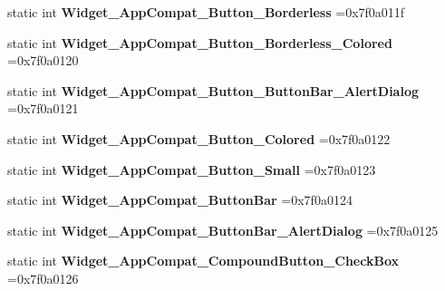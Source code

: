 \begin{DoxyCompactItemize}
static int {\bfseries Widget\+\_\+\+App\+Compat\+\_\+\+Button\+\_\+\+Borderless} =0x7f0a011f
\item 
\mbox{\label{classandroid_1_1support_1_1v7_1_1recyclerview_1_1R_1_1style_afcec0de494f8801a9a019ea2304d25cc}} 
static int {\bfseries Widget\+\_\+\+App\+Compat\+\_\+\+Button\+\_\+\+Borderless\+\_\+\+Colored} =0x7f0a0120
\item 
\mbox{\label{classandroid_1_1support_1_1v7_1_1recyclerview_1_1R_1_1style_ad7b5b5a7fbd4f4c7cae4dd8d569711ed}} 
static int {\bfseries Widget\+\_\+\+App\+Compat\+\_\+\+Button\+\_\+\+Button\+Bar\+\_\+\+Alert\+Dialog} =0x7f0a0121
\item 
\mbox{\label{classandroid_1_1support_1_1v7_1_1recyclerview_1_1R_1_1style_a88d21bc7245f60ac7d0b39c197595be6}} 
static int {\bfseries Widget\+\_\+\+App\+Compat\+\_\+\+Button\+\_\+\+Colored} =0x7f0a0122
\item 
\mbox{\label{classandroid_1_1support_1_1v7_1_1recyclerview_1_1R_1_1style_a359aee5b54e6bdc16a1b7f1c3bed4133}} 
static int {\bfseries Widget\+\_\+\+App\+Compat\+\_\+\+Button\+\_\+\+Small} =0x7f0a0123
\item 
\mbox{\label{classandroid_1_1support_1_1v7_1_1recyclerview_1_1R_1_1style_a6d170290e37298946a9a66ac08ced604}} 
static int {\bfseries Widget\+\_\+\+App\+Compat\+\_\+\+Button\+Bar} =0x7f0a0124
\item 
\mbox{\label{classandroid_1_1support_1_1v7_1_1recyclerview_1_1R_1_1style_a6073faa110bffd3305ecc0d0b4582339}} 
static int {\bfseries Widget\+\_\+\+App\+Compat\+\_\+\+Button\+Bar\+\_\+\+Alert\+Dialog} =0x7f0a0125
\item 
\mbox{\label{classandroid_1_1support_1_1v7_1_1recyclerview_1_1R_1_1style_abba3bde4964bba94e0142ea947beee41}} 
static int {\bfseries Widget\+\_\+\+App\+Compat\+\_\+\+Compound\+Button\+\_\+\+Check\+Box} =0x7f0a0126

\end{DoxyCompactItemize}
